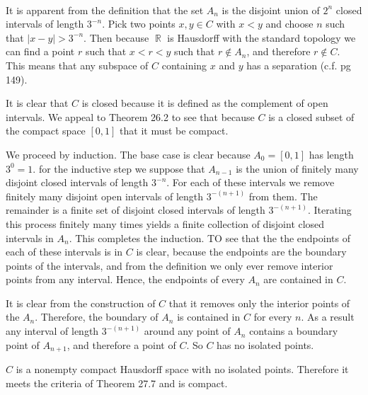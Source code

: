 \documentclass{article}
\DeclareMathOperator{\R}{\mathbb{R}}
\newcommand{\problem}[1]{\noindent{\textbf{Problem #1}}\\}
\newcommand{\problempart}[1]{\noindent{\textbf{(#1)}}}
\begin{document}
\problem{3.27.6}
\problempart{a} It is apparent from the definition that the set $A_n$ is the disjoint union of $2^n$ closed intervals of length $3^{-n}$. Pick two points $x,y \in C$ with $x < y$ and choose $n$ such that $|x-y| > 3^{-n}$. Then because $\R$ is Hausdorff with the standard topology we can find a point $r$ such that $x < r < y$ such that $r \not\in A_n$, and therefore $r\not\in C$. This means that any subspace of $C$ containing $x$ and $y$ has a separation (c.f. pg 149). 

\problempart{b} It is clear that $C$ is closed because it is defined as the complement of open intervals. We appeal to Theorem 26.2 to see that because $C$ is a closed subset of the compact space $[0,1]$ that it must be compact. 

\problempart{c} We proceed by induction. The base case is clear because $A_0 = [0,1]$ has length $3^{0} = 1$. for the inductive step we suppose that $A_{n-1}$ is the union of finitely many disjoint closed intervals of length $3^{-n}$. For each of these intervals we remove finitely many disjoint open intervals of length $3^{-(n+1)}$ from them. The remainder is a finite set of disjoint closed intervals of length $3^{-(n+1)}$. Iterating this process finitely many times yields a finite collection of disjoint closed intervals in $A_n$. This completes the induction. TO see that the the endpoints of each of these intervals is in $C$ is clear, because the endpoints are the boundary points of the intervals, and from the definition we only ever remove interior points from any interval. Hence, the endpoints of every $A_n$ are contained in $C$.   
 
\problempart{d} It is clear from the construction of $C$ that it removes only the interior points of the $A_n$. Therefore, the boundary of $A_n$ is contained in $C$ for every $n$. As a result any interval of length $3^{-(n+1)}$ around any point of $A_n$ contains a boundary point of $A_{n+1}$, and therefore a point of $C$. So $C$ has no isolated points.  

\problempart{e} $C$ is a nonempty compact Hausdorff space with no isolated points. Therefore it meets the criteria of Theorem 27.7 and is compact. 
\end{document}
